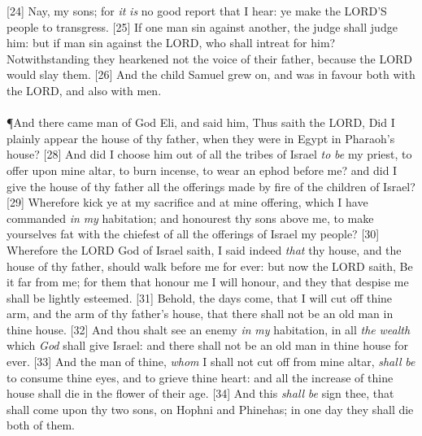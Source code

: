[24] \textcolor[cmyk]{0.99998,1,0,0}{Nay, my sons; for \emph{it} \emph{is} no good report that I hear: ye make the LORD'S people to transgress.}
[25] \textcolor[cmyk]{0.99998,1,0,0}{If one man sin against another, the judge shall judge him: but if  man sin against the LORD, who shall intreat for him? Notwithstanding they hearkened not  the voice of their father, because the LORD would slay them.}
[26] \textcolor[cmyk]{0.99998,1,0,0}{And the child Samuel grew on, and was in favour both with the LORD, and also with men.}\\
\\
\P \textcolor[cmyk]{0.99998,1,0,0}{And there came  man of God  Eli, and said  him, Thus saith the LORD, Did I plainly appear  the house of thy father, when they were in Egypt in Pharaoh's house?}
[28] \textcolor[cmyk]{0.99998,1,0,0}{And did I choose him out of all the tribes of Israel \emph{to} \emph{be} my priest, to offer upon mine altar, to burn incense, to wear an ephod before me? and did I give  the house of thy father all the offerings made by fire of the children of Israel?}
[29] \textcolor[cmyk]{0.99998,1,0,0}{Wherefore kick ye at my sacrifice and at mine offering, which I have commanded \emph{in} \emph{my} habitation; and honourest thy sons above me, to make yourselves fat with the chiefest of all the offerings of Israel my people?}
[30] \textcolor[cmyk]{0.99998,1,0,0}{Wherefore the LORD God of Israel saith, I said indeed \emph{that} thy house, and the house of thy father, should walk before me for ever: but now the LORD saith, Be it far from me; for them that honour me I will honour, and they that despise me shall be lightly esteemed.}
[31] \textcolor[cmyk]{0.99998,1,0,0}{Behold, the days come, that I will cut off thine arm, and the arm of thy father's house, that there shall not be an old man in thine house.}
[32] \textcolor[cmyk]{0.99998,1,0,0}{And thou shalt see an enemy \emph{in} \emph{my} habitation, in all \emph{the} \emph{wealth} which \emph{God} shall give Israel: and there shall not be an old man in thine house for ever.}
[33] \textcolor[cmyk]{0.99998,1,0,0}{And the man of thine, \emph{whom} I shall not cut off from mine altar, \emph{shall} \emph{be} to consume thine eyes, and to grieve thine heart: and all the increase of thine house shall die in the flower of their age.}
[34] \textcolor[cmyk]{0.99998,1,0,0}{And this \emph{shall} \emph{be}  sign  thee, that shall come upon thy two sons, on Hophni and Phinehas; in one day they shall die both of them.}
